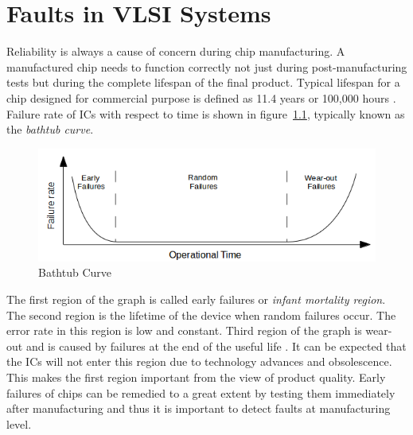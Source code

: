 \chapter{Faults in VLSI Systems}
\label{chap:chapter2}

Reliability is always a cause of concern during chip manufacturing. A manufactured chip needs to function correctly not just during post-manufacturing tests but during the complete lifespan of the final product. Typical lifespan for a chip designed for commercial purpose is defined as 11.4 years or 100,000 hours \cite{kishore2009}. Failure rate of ICs with respect to time is shown in figure~\ref{fig:bathtubcurve}, typically known as the \emph{bathtub curve}.

\begin{figure}[h]
  \begin{center}
    \captionsetup{justification=centering}
    \includegraphics[scale=0.5]{figures/bathtubcurve.png}
    \caption{Bathtub Curve}
    \label{fig:bathtubcurve}
  \end{center}
\end{figure}

The first region of the graph is called early failures or \emph{infant mortality region}. The second region is the lifetime of the device when random failures occur. The error rate in this region is low and constant. Third region of the graph is wear-out and is caused by failures at the end of the useful life \cite{kishore2009}. It can be expected that the ICs will not enter this region due to technology advances and obsolescence. This makes the first region important from the view of product quality. Early failures of chips can be remedied to a great extent by testing them immediately after manufacturing \cite{Agrawal2000} and thus it is important to detect faults at manufacturing level.

